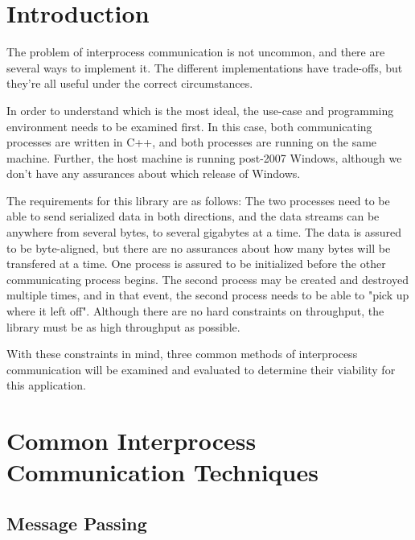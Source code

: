 \documentclass[se]{uw-wkrpt}
\begin{document}
\mainmatter

\section{Introduction}\label{sec:intro}


The problem of interprocess communication is not uncommon, and there
are several ways to implement it. The different implementations have
trade-offs, but they're all useful under the correct circumstances.

In order to understand which is the most ideal, the use-case and programming
environment needs to be examined first. In this case, both communicating
processes are written in C++, and both processes are running on the same
machine. Further, the host machine is running post-2007 Windows, although
we don't have any assurances about which release of Windows.

The requirements for this library are as follows: The two processes need to be able to send serialized data in both directions,
and the data streams can be anywhere from several bytes, to several gigabytes
at a time. The data is assured to be byte-aligned, but there are no assurances
about how many bytes will be transfered at a time. One process is assured to be initialized before the other communicating process begins.
The second process may be created and destroyed multiple times, and in that event,
the second process needs to be able to "pick up where it left off". Although
there are no hard constraints on throughput, the library must be as high throughput as possible.

With these constraints in mind, three common methods of interprocess communication
will be examined and evaluated to determine their viability for this application.

\section{Common Interprocess Communication Techniques}

\subsection{Message Passing}
\end{document}
